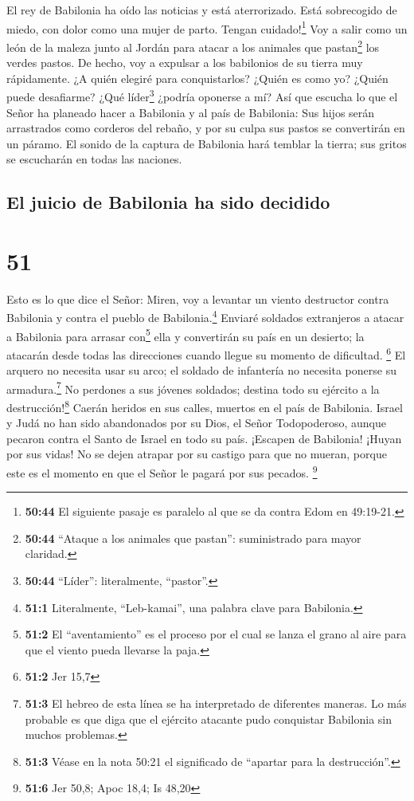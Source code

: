  El rey de Babilonia ha oído las noticias y está
aterrorizado. Está sobrecogido de miedo, con dolor como una mujer de
parto.  Tengan cuidado!\footnote{\textbf{50:44} El
  siguiente pasaje es paralelo al que se da contra Edom en 49:19-21.}
Voy a salir como un león de la maleza junto al Jordán para atacar a los
animales que pastan\footnote{\textbf{50:44} ``Ataque a los animales que
  pastan'': suministrado para mayor claridad.} los verdes pastos. De
hecho, voy a expulsar a los babilonios de su tierra muy rápidamente. ¿A
quién elegiré para conquistarlos? ¿Quién es como yo? ¿Quién puede
desafiarme? ¿Qué líder\footnote{\textbf{50:44} ``Líder'': literalmente,
  ``pastor''.} ¿podría oponerse a mí?  Así que escucha lo
que el Señor ha planeado hacer a Babilonia y al país de Babilonia: Sus
hijos serán arrastrados como corderos del rebaño, y por su culpa sus
pastos se convertirán en un páramo.  El sonido de la
captura de Babilonia hará temblar la tierra; sus gritos se escucharán en
todas las naciones.

\hypertarget{el-juicio-de-babilonia-ha-sido-decidido}{%
\subsection{El juicio de Babilonia ha sido
decidido}\label{el-juicio-de-babilonia-ha-sido-decidido}}

\hypertarget{section-50}{%
\section{51}\label{section-50}}

 Esto es lo que dice el Señor: Miren, voy a levantar un
viento destructor contra Babilonia y contra el pueblo de
Babilonia.\footnote{\textbf{51:1} Literalmente, ``Leb-kamai'', una
  palabra clave para Babilonia.}  Enviaré soldados
extranjeros a atacar a Babilonia para arrasar con\footnote{\textbf{51:2}
  El ``aventamiento'' es el proceso por el cual se lanza el grano al
  aire para que el viento pueda llevarse la paja.} ella y convertirán su
país en un desierto; la atacarán desde todas las direcciones cuando
llegue su momento de dificultad. \footnote{\textbf{51:2} Jer 15,7}
 El arquero no necesita usar su arco; el soldado de
infantería no necesita ponerse su armadura.\footnote{\textbf{51:3} El
  hebreo de esta línea se ha interpretado de diferentes maneras. Lo más
  probable es que diga que el ejército atacante pudo conquistar
  Babilonia sin muchos problemas.} No perdones a sus jóvenes soldados;
destina todo su ejército a la destrucción!\footnote{\textbf{51:3} Véase
  en la nota 50:21 el significado de ``apartar para la destrucción''.}
 Caerán heridos en sus calles, muertos en el país de
Babilonia.  Israel y Judá no han sido abandonados por su
Dios, el Señor Todopoderoso, aunque pecaron contra el Santo de Israel en
todo su país.  ¡Escapen de Babilonia! ¡Huyan por sus
vidas! No se dejen atrapar por su castigo para que no mueran, porque
este es el momento en que el Señor le pagará por sus pecados.
\footnote{\textbf{51:6} Jer 50,8; Apoc 18,4; Is 48,20}

